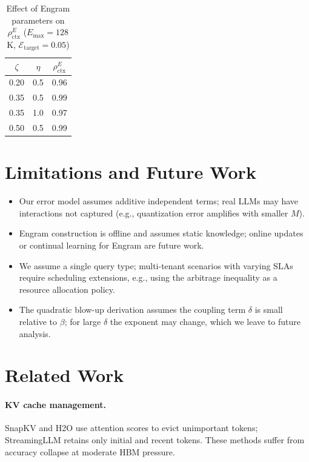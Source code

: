 \documentclass[11pt,a4paper]{article}
\theoremstyle{plain}
\theoremstyle{definition}
\begin{document}
\begin{table}[t]
\centering
\caption{Effect of Engram parameters on $\rho_{\text{ctx}}^E$ ($E_{\max}=128$K, $\mathcal{E}_{\text{target}}=0.05$)}
\begin{tabular}{@{}ccc@{}}
\toprule
$\zeta$ & $\eta$ & $\rho_{\text{ctx}}^E$ \\
\midrule
0.20 & 0.5 & 0.96 \\
0.35 & 0.5 & 0.99 \\
0.35 & 1.0 & 0.97 \\
0.50 & 0.5 & 0.99 \\
\bottomrule
\end{tabular}
\label{tab:ablate}
\end{table}

\section{Limitations and Future Work}
\begin{itemize}
    \item Our error model assumes additive independent terms; real LLMs may have interactions not captured (e.g., quantization error amplifies with smaller $M$).
    \item Engram construction is offline and assumes static knowledge; online updates or continual learning for Engram are future work.
    \item We assume a single query type; multi-tenant scenarios with varying SLAs require scheduling extensions, e.g., using the arbitrage inequality as a resource allocation policy.
    \item The quadratic blow-up derivation assumes the coupling term $\delta$ is small relative to $\beta$; for large $\delta$ the exponent may change, which we leave to future analysis.
\end{itemize}

\section{Related Work}
\paragraph{KV cache management.} SnapKV \cite{snapkv} and H2O \cite{h2o} use attention scores to evict unimportant tokens; StreamingLLM \cite{streamingllm} retains only initial and recent tokens. These methods suffer from accuracy collapse at moderate HBM pressure.
\end{document}
